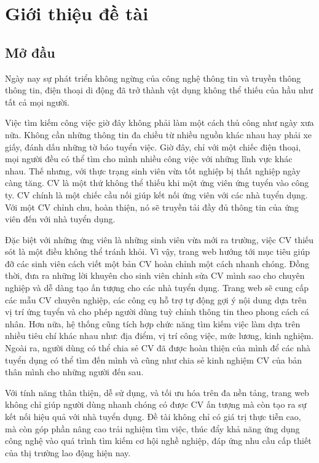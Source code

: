 \chapter{Giới thiệu đề tài}
\section{Mở đầu}
Ngày nay sự phát triển không ngừng của công nghệ thông tin và truyền thông thông tin, điện thoại di động đã trở thành vật dụng không thể thiếu của hầu như tất cả mọi người.

Việc tìm kiếm công việc giờ đây không phải làm một cách thủ công như ngày xưa nữa. Không cần những thông tin đa chiều từ nhiều nguồn khác nhau hay phải xe giấy, đánh dấu những tờ báo tuyển việc. Giờ đây, chỉ với một chiếc điện thoại, mọi người đều có thể tìm cho mình nhiều công việc với những lĩnh vực khác nhau. Thế nhưng, với thực trạng sinh viên vừa tốt nghiệp bị thất nghiệp ngày càng tăng. CV là một thứ không thể thiếu khi một ứng viên ứng tuyển vào công ty. CV chính là một chiếc cầu nối giúp kết nối ứng viên với các nhà tuyển dụng. Với một CV chỉnh chu, hoàn thiện, nó sẽ truyền tải đầy đủ thông tin của ứng viên đến với nhà tuyển dụng.

Đặc biệt với những ứng viên là những sinh viên vừa mới ra trường, việc CV thiếu sót là một điều không thể tránh khỏi. Vì vậy, trang web hướng tới mục tiêu giúp đỡ các sinh viên cách viết một bản CV hoàn chỉnh một cách nhanh chóng. Đồng thời, đưa ra những lời khuyên cho sinh viên chỉnh sửa CV mình sao cho chuyên nghiệp và dễ dàng tạo ấn tượng cho các nhà tuyển dụng. Trang web sẽ cung cấp các mẫu CV chuyên nghiệp, các công cụ hỗ trợ tự động gợi ý nội dung dựa trên vị trí ứng tuyển và cho phép người dùng tuỳ chỉnh thông tin theo phong cách cá nhân. Hơn nữa, hệ thống cũng tích hợp chức năng tìm kiếm việc làm dựa trên nhiều tiêu chí khác nhau như: địa điểm, vị trí công việc, mức lương, kinh nghiệm. Ngoài ra, người dùng có thể chia sẻ CV đã được hoàn thiện của mình để các nhà tuyển dụng có thể tìm đến mình và cũng như chia sẻ kinh nghiệm CV của bản thân mình cho những người đến sau. 

Với tính năng thân thiện, dễ sử dụng, và tối ưu hóa trên đa nền tảng, trang web không chỉ giúp người dùng nhanh chóng có được CV ấn tượng mà còn tạo ra sự kết nối hiệu quả với nhà tuyển dụng. Đề tài không chỉ có giá trị thực tiễn cao, mà còn góp phần nâng cao trải nghiệm tìm việc, thúc đẩy khả năng ứng dụng công nghệ vào quá trình tìm kiếm cơ hội nghề nghiệp, đáp ứng nhu cầu cấp thiết của thị trường lao động hiện nay.

